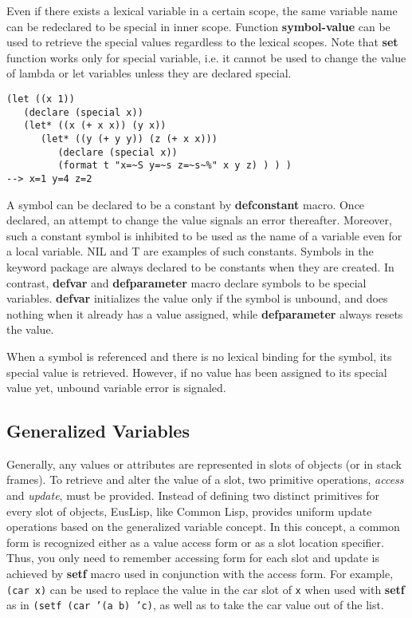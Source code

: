 Even if there exists a lexical variable in a certain scope,
the same variable name can be redeclared to be special in inner scope.
Function {\bf symbol-value} can be used to retrieve  the special values
regardless to the lexical scopes.
Note that {\bf set} function works only for special variable, i.e.
it cannot be used to change the value of lambda or let variables
unless they are declared special.

\begin{verbatim}
(let ((x 1))
   (declare (special x))
   (let* ((x (+ x x)) (y x))
      (let* ((y (+ y y)) (z (+ x x)))
         (declare (special x))
         (format t "x=~S y=~s z=~s~%" x y z) ) ) )
--> x=1 y=4 z=2
\end{verbatim}

A symbol can be declared to be a constant by {\bf defconstant} macro.
Once declared, an attempt to change the value signals an error thereafter.
Moreover, such a constant symbol is inhibited to be used as
the name of a variable even for a local variable.
NIL and T are examples of such constants.
Symbols in the keyword package are always declared to be constants
when they are created.
In contrast, {\bf defvar} and {\bf defparameter} macro declare
symbols to be special variables.
{\bf defvar} initializes the value only if the symbol is unbound,
and does nothing when it already has a value assigned,
while {\bf defparameter} always resets the value.

When a symbol is referenced and there is no lexical binding for the symbol,
its special value is retrieved.
However, if no value has been assigned to its special value yet,
unbound variable error is signaled.

\subsection{Generalized Variables}
Generally, any values or attributes are represented in slots of objects
(or in stack frames).
To retrieve and alter the value of a slot,
two primitive operations, {\em access} and {\em update}, must be provided.
Instead of defining two distinct primitives for every slot of objects,
EusLisp, like Common Lisp, provides uniform update operations
based on the generalized variable concept.
In this concept, a common form is recognized  either as a value access form
or as a slot location specifier.
Thus, you only need to remember accessing form for each slot and
update is achieved by {\bf setf} macro used in conjunction with the access form.
For example, {\tt (car x)} can be used to replace the value
in the car slot of {\tt x} when used with {\bf setf} as in {\tt (setf (car 
'(a b) 'c)},
as well as to take the car value out of the list.

